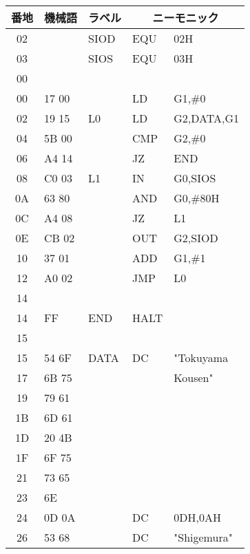 \begin{center}
{{\begin{description}
\begin{center}
{\footnotesize\tt
\begin{tabular}{|c|l|l|l l|} \hline
番地 & 機械語 & ラベル & \multicolumn{2}{|c|}{ニーモニック} \\
\hline
02 &         &  SIOD  &  EQU    & 02H            \\
03 &         &  SIOS  &  EQU    & 03H            \\
00 &         &        &         &                \\
00 &  17 00  &        &  LD     & G1,\#0         \\
02 &  19 15  &  L0    &  LD     & G2,DATA,G1     \\
04 &  5B 00  &        &  CMP    & G2,\#0         \\
06 &  A4 14  &        &  JZ     & END            \\
08 &  C0 03  &  L1    &  IN     & G0,SIOS        \\
0A &  63 80  &        &  AND    & G0,\#80H       \\
0C &  A4 08  &        &  JZ     & L1             \\
0E &  CB 02  &        &  OUT    & G2,SIOD        \\
10 &  37 01  &        &  ADD    & G1,\#1         \\
12 &  A0 02  &        &  JMP    & L0             \\
14 &         &        &         &                \\
14 &  FF     &  END   &  HALT   &                \\
15 &         &        &         &                \\
15 &  54 6F  &  DATA  &  DC     & "Tokuyama      \\
17 &  6B 75  &        &         &   Kousen"      \\
19 &  79 61  &        &         &                \\
1B &  6D 61  &        &         &                \\
1D &  20 4B  &        &         &                \\
1F &  6F 75  &        &         &                \\
21 &  73 65  &        &         &                \\
23 &  6E     &        &         &                \\
24 &  0D 0A  &        &  DC     & 0DH,0AH        \\
26 &  53 68  &        &  DC     & "Shigemura"    \\

\end{tabular}}
\end{center}
\end{description}}}
\end{center}
